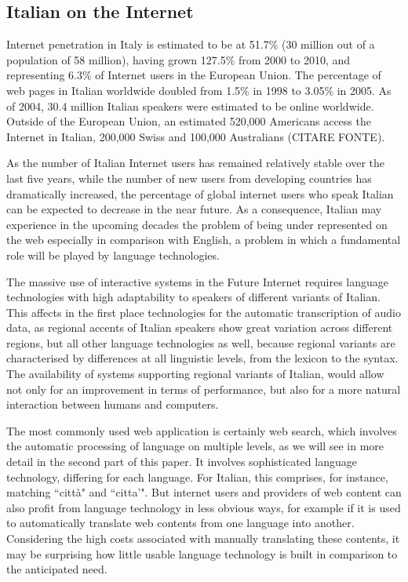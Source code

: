 \documentclass[]{../../metanetpaper}
\begin{document}
\begin{multicols}{2}
\subsection{Italian on the Internet}

Internet penetration in Italy is estimated to be at 51.7\% (30 million out of
a population of 58 million), having grown 127.5\% from 2000 to 2010, and
representing 6.3\% of Internet users in the European Union. The percentage of
web pages in Italian worldwide doubled from 1.5\% in 1998 to 3.05\% in
2005. As of 2004, 30.4 million Italian speakers were estimated to be online
worldwide. Outside of the European Union, an estimated 520,000 Americans
access the Internet in Italian, 200,000 Swiss and 100,000 Australians (CITARE
FONTE).



As the number of Italian Internet users has remained relatively stable over
the last five years, while the number of new users from developing countries
has dramatically increased, the percentage of global internet users who speak
Italian can be expected to decrease in the near future. As a consequence,
Italian may experience in the upcoming decades the problem of being under
represented on the web especially in comparison with English, a problem in
which a fundamental role will be played by language technologies.



The massive use of interactive systems in the Future Internet requires
language technologies with high adaptability to speakers of different variants
of Italian. This affects in the first place technologies for the automatic
transcription of audio data, as regional accents of Italian speakers show
great variation across different regions, but all other language technologies
as well, because regional variants are characterised by differences at all
linguistic levels, from the lexicon to the syntax. The availability of systems
supporting regional variants of Italian, would allow not only for an
improvement in terms of performance, but also for a more natural interaction
between humans and computers.
 
The most commonly used web application is certainly web search, which involves
the automatic processing of language on multiple levels, as we will see in
more detail in the second part of this paper. It involves sophisticated
language technology, differing for each language. For Italian, this comprises,
for instance, matching “citt\`{a}" and “citta'". But internet
users and providers of web content can also profit from language technology in
less obvious ways, for example if it is used to automatically translate web
contents from one language into another. Considering the high costs associated
with manually translating these contents, it may be surprising how little
usable language technology is built in comparison to the anticipated need.


\end{multicols}
\end{document}
